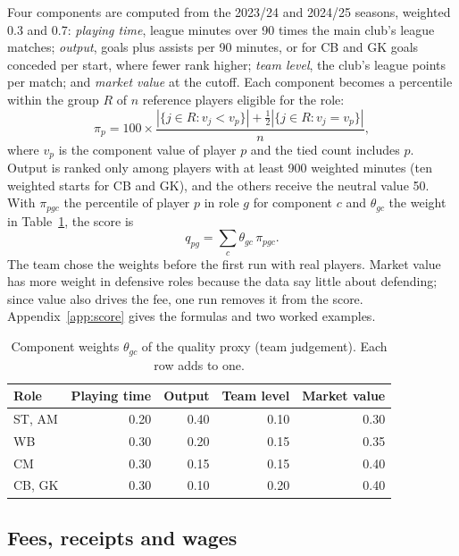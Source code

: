 Four components are computed from the 2023/24 and 2024/25 seasons, weighted 0.3 and 0.7: \emph{playing time}, league minutes over 90 times the main club's league matches; \emph{output}, goals plus assists per 90 minutes, or for CB and GK goals conceded per start, where fewer rank higher; \emph{team level}, the club's league points per match; and \emph{market value} at the cutoff. Each component becomes a percentile within the group $R$ of $n$ reference players eligible for the role:
\begin{equation}\label{eq:percentile}
\pi_p = 100 \times \frac{\left|\{ j \in R : v_j < v_p \}\right| + \tfrac{1}{2} \left|\{ j \in R : v_j = v_p \}\right|}{n},
\end{equation}
where $v_p$ is the component value of player $p$ and the tied count includes $p$. Output is ranked only among players with at least 900 weighted minutes (ten weighted starts for CB and GK), and the others receive the neutral value 50. With $\pi_{pgc}$ the percentile of player $p$ in role $g$ for component $c$ and $\theta_{gc}$ the weight in Table~\ref{tab:weights}, the score is
\begin{equation}\label{eq:score}
q_{pg} = \sum_{c} \theta_{gc}\, \pi_{pgc}.
\end{equation}
The team chose the weights before the first run with real players. Market value has more weight in defensive roles because the data say little about defending; since value also drives the fee, one run removes it from the score. Appendix~\ref{app:score} gives the formulas and two worked examples.

\begin{table}[!htbp]
\centering
\caption{Component weights $\theta_{gc}$ of the quality proxy (team judgement). Each row adds to one.}\label{tab:weights}
\begin{tabular}{@{}l r r r r@{}}
\toprule
Role & Playing time & Output & Team level & Market value \\
\midrule
ST, AM & 0.20 & 0.40 & 0.10 & 0.30 \\
WB & 0.30 & 0.20 & 0.15 & 0.35 \\
CM & 0.30 & 0.15 & 0.15 & 0.40 \\
CB, GK & 0.30 & 0.10 & 0.20 & 0.40 \\
\bottomrule
\end{tabular}
\end{table}

\subsection{Fees, receipts and wages}

